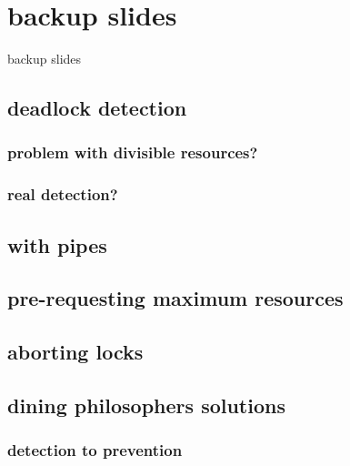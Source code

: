 

\section{backup slides}
\begin{frame}{}
\end{frame}
\begin{frame}{backup slides}
\end{frame}
\subsection{deadlock detection}


\subsubsection{problem with divisible resources?}


\subsubsection{real detection?}



\subsection{with pipes}


\subsection{pre-requesting maximum resources}



\subsection{aborting locks}



\subsection{dining philosophers solutions}



\subsubsection{detection to prevention}

